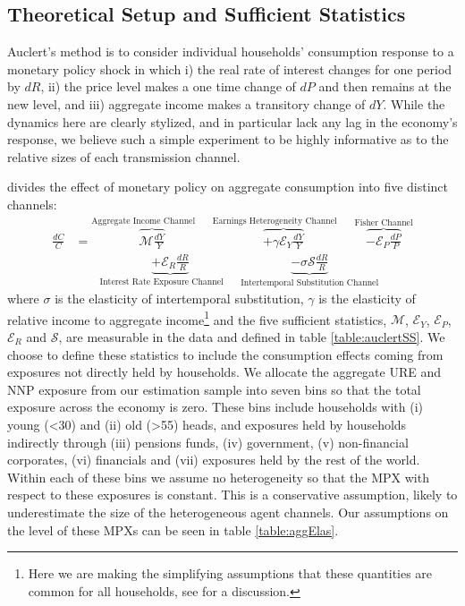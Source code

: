 \documentclass[titlepage]{\econtex}\newcommand{\texname}{ConsumptionHeterogeneity}
\begin{document}
\subsection{Theoretical Setup and Sufficient Statistics}
Auclert's method is to consider individual households' consumption response to a monetary policy shock in which i) the real rate of interest changes for one period by $dR$, ii) the price level makes a one time change of $dP$ and then remains at the new level, and iii) aggregate income makes a transitory change of $dY$. While the dynamics here are clearly stylized, and in particular lack any lag in the economy's response, we believe such a simple experiment to be highly informative as to the relative sizes of each transmission channel.

\cite{auclert_monetary_2017} divides the effect of monetary policy on aggregate consumption into five distinct channels:
\begin{align} 
\frac{dC}{C} &= \overbrace{\mathcal{M}\frac{dY}{Y}}^{\text{Aggregate Income Channel}\qquad} \overbrace{ + \gamma \mathcal{E}_Y \frac{dY}{Y}}^{\text{Earnings Heterogeneity Channel}\qquad} \overbrace{ - \mathcal{E}_P\frac{dP}{P}}^{\text{Fisher Channel}}  \nonumber \\
& \qquad \underbrace{ + \mathcal{E}_R \frac{dR}{R}}_{\text{Interest Rate Exposure Channel}\qquad}  \underbrace{ - \sigma \mathcal{S}\frac{dR}{R}}_{\text{Intertemporal Substitution Channel}} \label{auclert_channels}
\end{align}
where $\sigma$ is the elasticity of intertemporal substitution, $\gamma$ is the elasticity of relative income to aggregate income\footnote{Here we are making the simplifying assumptions that these quantities are common for all households, see \cite{auclert_monetary_2017} for a discussion.} and the five sufficient statistics, $\mathcal{M}$, $\mathcal{E}_Y$, $\mathcal{E}_P$, $\mathcal{E}_R$ and $\mathcal{S}$, are measurable in the data and defined in table \ref{table:auclertSS}. We choose to define these statistics to include the consumption effects coming from exposures not directly held by households. We allocate the aggregate URE and NNP exposure from our estimation sample into seven bins so that the total exposure across the economy is zero. These bins include households with (i) young (<30) and (ii) old (>55) heads, and exposures held by households indirectly through (iii) pensions funds, (iv) government, (v) non-financial corporates, (vi) financials and (vii) exposures held by the rest of the world. Within each of these bins we assume no heterogeneity so that the MPX with respect to these exposures is constant. This is a conservative assumption, likely to underestimate the size of the heterogeneous agent channels. Our assumptions on the level of these MPXs can be seen in table \ref{table:aggElas}.
\end{document}
